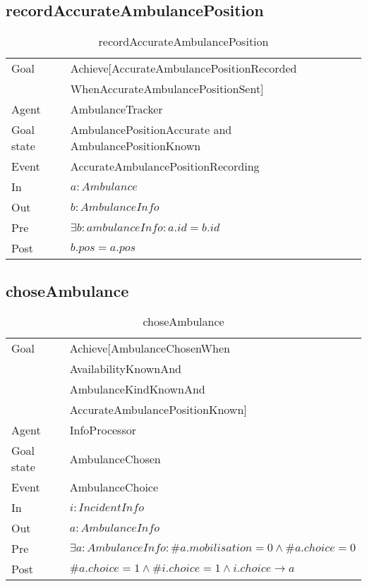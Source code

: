\subsection{recordAccurateAmbulancePosition}
	\begin{table}[!h] \centering
		\begin{tabularx}{\textwidth}{|l|X|} \hline
			Goal & Achieve[AccurateAmbulancePositionRecorded\\ &WhenAccurateAmbulancePositionSent] \\ \hline
			Agent & AmbulanceTracker \\ \hline
			Goal state & AmbulancePositionAccurate and AmbulancePositionKnown \\ \hline
			Event & AccurateAmbulancePositionRecording \\ \hline
			In & $a: Ambulance$ \\ \hline
			Out & $b: AmbulanceInfo$ \\ \hline
			Pre & $\exists b: ambulanceInfo : a.id = b.id$ \\ \hline
			Post & $b.pos = a.pos$ \\ \hline
		\end{tabularx}
		\caption{recordAccurateAmbulancePosition}
	\end{table}

\subsection{choseAmbulance}
	\begin{table}[!h] \centering
		\begin{tabularx}{\textwidth}{|l|X|} \hline
			Goal & Achieve[AmbulanceChosenWhen\\ & AvailabilityKnownAnd \\ & AmbulanceKindKnownAnd \\ & AccurateAmbulancePositionKnown] \\ \hline
			Agent & InfoProcessor \\ \hline
			Goal state & AmbulanceChosen \\ \hline
			Event & AmbulanceChoice \\ \hline
			In & $i: IncidentInfo$ \\ \hline
			Out & $a: AmbulanceInfo$ \\ \hline
			Pre & $\exists a: AmbulanceInfo : \#a.mobilisation = 0 \wedge \#a.choice = 0$ \\ \hline
			Post & $\#a.choice = 1 \wedge \#i.choice = 1 \wedge i.choice \rightarrow a$ \\ \hline
		\end{tabularx}
		\caption{choseAmbulance}
	\end{table}

